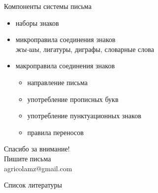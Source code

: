 \begin{frame}{Компоненты системы письма}
\begin{itemize}
\item наборы знаков
\item микроправила соединения знаков\\
\textit{жы-шы}, лигатуры, диграфы, словарные слова
\item макроправила соединения знаков
\begin{itemize}
\item направление письма
\item употребление прописных букв
\item употребление пунктуационных знаков
\item правила переносов
\end{itemize}
\end{itemize}
\end{frame}
\begin{frame}
{\huge Спасибо за внимание!\bigskip\\
\normalsize Пишите письма\\
agricolamz@gmail.com
\vspace{-130pt}}
\end{frame}
\begin{frame}{Список литературы}
\footnotesize


\end{frame}
